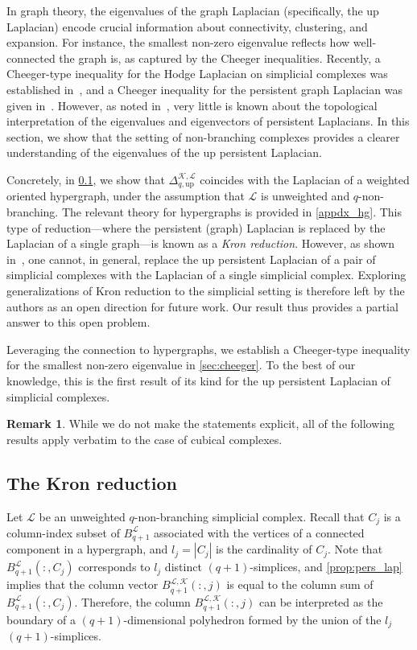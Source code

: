 \documentclass{article}
\theoremstyle{definition}
\newtheorem{remark}[theorem]{Remark}
\newcommand{\KK}{\mathcal{K}}
\newcommand{\LL}{\mathcal{L}}
\begin{document}
In graph theory, the eigenvalues of the graph Laplacian (specifically, the up Laplacian) encode crucial information about connectivity, clustering, and expansion. For instance, the smallest non-zero eigenvalue reflects how well-connected the graph is, as captured by the Cheeger inequalities. Recently, a Cheeger-type inequality for the Hodge Laplacian on simplicial complexes was established in~\cite{jost2023cheeger}, and a Cheeger inequality for the persistent graph Laplacian was given in~\cite{pers_lap}. However, as noted in~\cite{wei2023}, very little is known about the topological interpretation of the eigenvalues and eigenvectors of persistent Laplacians. In this section, we show that the setting of non-branching complexes provides a clearer understanding of the eigenvalues of the up persistent Laplacian.

Concretely, in \cref{sec:kron}, we show that $\Delta_{q, \mathrm{up}}^{\KK, \LL}$ coincides with the Laplacian of a weighted oriented hypergraph, under the assumption that $\LL$ is unweighted and $q$-non-branching. The relevant theory for hypergraphs is provided in \cref{appdx_hg}. This type of reduction—where the persistent (graph) Laplacian is replaced by the Laplacian of a single graph—is known as a \emph{Kron reduction}. However, as shown in~\cite[Section SM5]{pers_lap}, one cannot, in general, replace the up persistent Laplacian of a pair of simplicial complexes with the Laplacian of a single simplicial complex. Exploring generalizations of Kron reduction to the simplicial setting is therefore left by the authors as an open direction for future work. Our result thus provides a partial answer to this open problem.

Leveraging the connection to hypergraphs, we establish a Cheeger-type inequality for the smallest non-zero eigenvalue in \cref{sec:cheeger}. To the best of our knowledge, this is the first result of its kind for the up persistent Laplacian of simplicial complexes.

\begin{remark}
While we do not make the statements explicit, all of the following results apply verbatim to the case of cubical complexes.
\end{remark}


\subsection{The Kron reduction}
\label{sec:kron}
Let $\LL$ be an unweighted $q$-non-branching simplicial complex. 
Recall that $C_j$ is a column-index subset of $B_{q+1}^\LL$ associated with the vertices of a connected component in a hypergraph, 
and $l_j = |C_j|$ is the cardinality of $C_j$. 
Note that $B_{q+1}^\LL(:, C_j)$ corresponds to $l_j$ distinct $(q+1)$-simplices,
and \cref{prop:pers_lap} implies that the column vector $B_{q+1}^{\LL, \KK}(:, j)$ is equal to the column sum of $B_{q+1}^\LL(:, C_j)$. Therefore, the column $B_{q+1}^{\LL, \KK}(:, j)$ can be interpreted as the boundary of a $(q+1)$-dimensional polyhedron formed by the union of the $l_j$ $(q+1)$-simplices.
\end{document}
